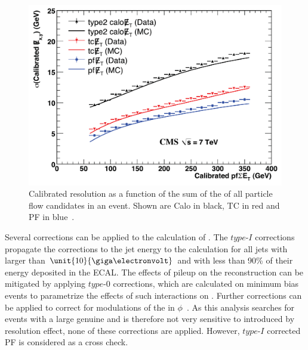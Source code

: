\begin{figure}
\begin{center}
\includegraphics[scale=0.2]{plots/RECO/METResolution.png}
\caption{Calibrated \MET resolution as a function of the sum of the \Et of all particle flow candidates in an event. Shown are Calo \MET in black, TC \MET in red and PF \MET in blue~\cite{7TeVMETPaper}.}
\label{fig:METReso}
\end{center}
\end{figure}

Several corrections can be applied to the calculation of \MET. The $\textit{type-I}$ corrections propagate the corrections to the jet energy to the \MET calculation for all jets with \pt larger than $\unit{10}{\giga\electronvolt}$ and with less than 90\% of their energy deposited in the ECAL. The effects of pileup on the \MET reconstruction can be mitigated by applying $\textit{type-0}$ corrections, which are calculated on minimum bias events to parametrize the effects of such interactions on \MET. Further corrections can be applied to correct for modulations of the \MET in $\phi$~\cite{CMS-PAS-JME-12-002}. As this analysis searches for events with a large genuine \MET and is therefore not very sensitive to \MET introduced by resolution effect, none of these corrections are applied. However, $\textit{type-I}$ corrected PF \MET is considered as a cross check. 
